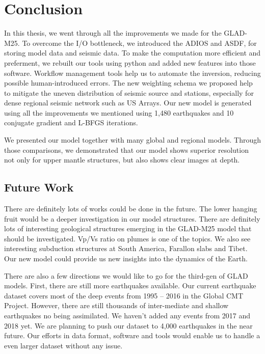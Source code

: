 \newpage
\chapter{Conclusion}
\label{ch:conclusion}

In this thesis, we went through all the improvements we made for the GLAD-M25.
To overcome the I/O bottleneck, we introduced the ADIOS and ASDF, for storing 
model data and seismic data. To make the computation more efficient and preferment,
we rebuilt our tools using python and added new features into those software.
Workflow management tools help us to automate the inversion, reducing possible
human-introduced errors. The new weighting schema we proposed help to
mitigate the uneven distribution of seismic source and stations, especially
for dense regional seismic network such as US Arrays. Our new model is
generated using all the improvements we mentioned using 1,480 earthquakes and
10 conjugate gradient and L-BFGS iterations.

We presented our model together with many global and regional models. Through
those comparisons, we demonstrated that our model shows superior resolution
not only for upper mantle structures, but also shows clear images at depth.

\section{Future Work}

There are definitely lots of works could be done in the future. The lower hanging
fruit would be a deeper investigation in our model structures.
There are definitely lots of interesting geological structures emerging in the
GLAD-M25 model that should be investigated. Vp/Vs ratio on plumes is one of
the topics. We also see interesting subduction structures at South America,
Farallon slabs and Tibet. Our new model could provide us new insights into the
dynamics of the Earth.

There are also a few directions we would like to go for the third-gen of GLAD
models. First, there are still more earthquakes available. Our current earthquake
dataset covers most of the deep events from 1995 -- 2016 in the Global CMT Project. However,
there are still thousands of inter-mediate and shallow earthquakes no being
assimilated. We haven't added any events from 2017 and 2018 yet. We are planning
to push our dataset to 4,000 earthquakes in the near future. Our efforts 
in data format, software and tools would enable us to handle a even larger dataset
without any issue.

